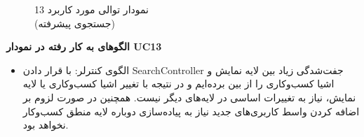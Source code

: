 \documentclass[12pt]{article}
\begin{document}
	\begin{figure}[H]
		\centering
		\caption{نمودار توالی مورد کاربرد 13\\
			(جستجوی پیشرفته)
		}
		\label{fig:sd-uc13}
	\end{figure}

	\textbf{الگوهای به کار رفته در نمودار UC13}
	\begin{itemize}
		\item
		الگوی کنترلر: با قرار دادن SearchController جفت‌شدگی زیاد بین لایه نمایش و اشیا کسب‌و‌کاری را از بین برده‌ایم و در‌ نتیجه با تغییر اشیا کسب‌وکاری یا لایه نمایش، نیاز به تغییرات اساسی در لایه‌های  دیگر نیست. همچنین در صورت لزوم بر اضافه کردن واسط کاربری‌های جدید نیاز به پیاده‌سازی دوباره لایه منطق کسب‌و‌کار نخواهد بود.
	\end{itemize}

	\newpage
\end{document}
